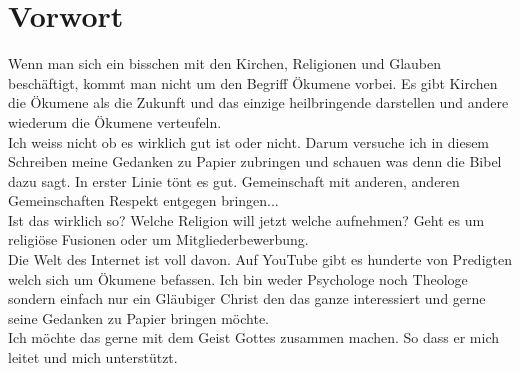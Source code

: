 \section{Vorwort}

Wenn man sich ein bisschen mit den Kirchen, Religionen und Glauben beschäftigt, kommt man nicht um den Begriff Ökumene vorbei. Es gibt Kirchen die Ökumene als die Zukunft und das einzige heilbringende darstellen und andere wiederum die Ökumene verteufeln.\\
Ich weiss nicht ob es wirklich gut ist oder nicht. Darum versuche ich in diesem Schreiben meine Gedanken zu Papier zubringen und schauen was denn die Bibel dazu sagt. In erster Linie tönt es gut. Gemeinschaft mit anderen, anderen Gemeinschaften Respekt entgegen bringen...\\
Ist das wirklich so? Welche Religion will jetzt welche aufnehmen? Geht es um religiöse Fusionen oder um Mitgliederbewerbung. \\ 
Die Welt des Internet ist voll davon. Auf YouTube gibt es hunderte von Predigten welch sich um Ökumene befassen. Ich bin weder Psychologe noch Theologe sondern einfach nur ein Gläubiger Christ den das ganze interessiert und gerne seine Gedanken zu Papier bringen möchte.\\
Ich möchte das gerne mit dem Geist Gottes zusammen machen. So dass er mich leitet und mich unterstützt.\\\\






